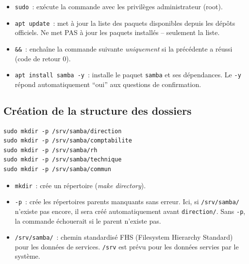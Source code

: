 \documentclass[12pt,a4paper]{article}
\begin{document}
\begin{explainbox}
\begin{itemize}[leftmargin=1.5em,topsep=2pt]
  \item \texttt{sudo}~: exécute la commande avec les privilèges administrateur (root).
  \item \texttt{apt update}~: met à jour la liste des paquets disponibles depuis les dépôts
    officiels. Ne met PAS à jour les paquets installés -- seulement la liste.
  \item \texttt{\&\&}~: enchaîne la commande suivante \textit{uniquement} si la précédente
    a réussi (code de retour 0).
  \item \texttt{apt install samba -y}~: installe le paquet \texttt{samba} et ses dépendances.
    Le \texttt{-y} répond automatiquement ``oui'' aux questions de confirmation.
\end{itemize}
\end{explainbox}

\subsection{Création de la structure des dossiers}

\begin{lstlisting}[style=terminal]
sudo mkdir -p /srv/samba/direction
sudo mkdir -p /srv/samba/comptabilite
sudo mkdir -p /srv/samba/rh
sudo mkdir -p /srv/samba/technique
sudo mkdir -p /srv/samba/commun
\end{lstlisting}

\begin{explainbox}
\begin{itemize}[leftmargin=1.5em,topsep=2pt]
  \item \texttt{mkdir}~: crée un répertoire (\textit{make directory}).
  \item \texttt{-p}~: crée les répertoires parents manquants sans erreur. Ici, si
    \texttt{/srv/samba/} n'existe pas encore, il sera créé automatiquement avant
    \texttt{direction/}. Sans \texttt{-p}, la commande échouerait si le parent n'existe pas.
  \item \texttt{/srv/samba/}~: chemin standardisé FHS (Filesystem Hierarchy Standard)
    pour les données de services. \texttt{/srv} est prévu pour les données servies par le
    système.
\end{itemize}
\end{explainbox}
\end{document}
